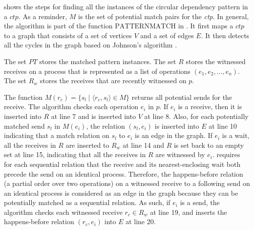  shows the steps for finding all the instances of the circular dependency pattern in a $\mathit{ctp}$. As a reminder, $M$ is the set of potential match pairs for the \emph{ctp}. In general, the algorithm is part of the function $\mathrm{PATTERNMATCH}$ in . 
It first maps a $\mathit{ctp}$ to a graph that consists of a set of vertices $\mathit{V}$ and a set of edges $\mathit{E}$. 
It then detects all the cycles in the graph based on Johnson's algorithm \cite{DBLP:journals/siamcomp/Johnson75}.
 
The set $\mathit{PT}$ stores the matched pattern instances.
The set $\mathit{R}$ stores the witnessed receives on a process that is represented as a list of operations $(e_1, e_2, \dots, e_n)$. 
The set $\mathit{R_w}$ stores the receives that are recently witnessed on $p$.

The function $\mathit{M}(\mathit{r_c}) = \{\mathit{s_l}\mid\langle\mathit{r_c},\mathit{s_l}\rangle\in\mathit{M}\}$ returns all potential sends for the receive. The algorithm checks each operation $e_i$ in $p$. 
If $\mathit{e_i}$ is a receive, then it is inserted into $\mathit{R}$ at line 7 and is inserted into $\mathit{V}$ at line 8. 
Also, for each potentially matched send $\mathit{s_l}$ in $\mathit{M}(\mathit{e_i})$, the relation $(\mathit{s_l},\mathit{e_i})$ is inserted into $\mathit{E}$ at line 10 indicating that a match relation on $\mathit{s_l}$ to $\mathit{e_i}$ is an edge in the graph. 
If $\mathit{e_i}$ is a wait, all the receives in $\mathit{R}$ are inserted to $\mathit{R_w}$ at line 14 and $\mathit{R}$ is set back to an empty set at line 15, indicating that all the receives in $\mathit{R}$ are witnessed by $\mathit{e_i}$. 
 requires for each sequential relation that the receive and its nearest-enclosing wait both precede the send on an identical process. 
Therefore, the happens-before relation (a partial order over two operations) on a witnessed receive to a following send on an identical process is considered as an edge in the graph because they can be potentially matched as a sequential relation.
As such, if $\mathit{e_i}$ is a send, the algorithm checks each witnessed receive $\mathit{r_c}\in \mathit{R_w}$ at line 19, and inserts the happens-before relation $(\mathit{r_c},\mathit{e_i})$ into $\mathit{E}$ at line 20. 

